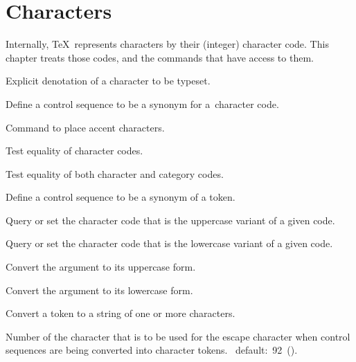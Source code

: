 
\chapter{Characters}\label{char}

Internally, \TeX\ represents characters by their (integer) 
character code. This chapter treats those codes, and the
commands that have access to them.

\label{cschap:char}\label{cschap:chardef}\label{cschap:accent}\label{cschap:uccode}\label{cschap:lccode}\label{cschap:uppercase}\label{cschap:lowercase}\label{cschap:string}\label{cschap:escapechar}
\begin{inventory}
\item [\cs{char}]
      Explicit denotation of a character to be typeset. 

\item [\cs{chardef}] 
      Define a control sequence to be a synonym for
      a~character code.

\item [\cs{accent}] 
      Command to place accent characters.

\item [\cs{if}]
      Test equality of character codes. 

\item [\cs{ifx}]
      Test equality of both character and category codes.

\item [\cs{let}]
      Define a control sequence to be a synonym of a token.

\item [\cs{uccode}] 
      Query or set
      the character code that is the uppercase variant of a given code.

\item [\cs{lccode}]
      Query or set
      the character code that is the lowercase variant of a given code.

\item [\cs{uppercase}]
      Convert the  argument to its uppercase form.

\item [\cs{lowercase}] 
      Convert the  argument to its lowercase form.

\item [\cs{string}]
      Convert a token to a string of one or more characters.
\item [\cs{escapechar}]
      Number of the character that is to be used 
      for the escape character
      when control sequences are being converted
      into character tokens. \IniTeX\ default:~92~(\cs{}).
\end{inventory}

